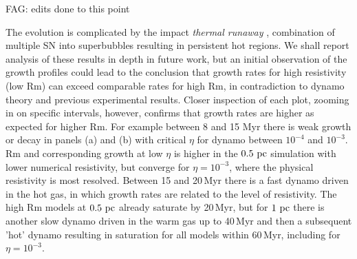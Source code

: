 \documentclass[preprint2]{aastex63}
\newcommand\pc{~ {\rm pc}}
\newcommand{\fag}[1]{\textcolor{midgreen}{FAG: #1}}
\begin{document}
\fag{edits done to this point}

The evolution is complicated by the impact \emph{thermal runaway}
\citep[see e.g.,][]{LOCBN15}, combination of multiple SN into superbubbles
resulting in persistent hot regions.
We shall report analysis of these results in depth in future work, but an 
initial observation of the growth profiles could lead to the conclusion that
growth rates for high resistivity (low Rm) can exceed comparable rates for high
Rm, in contradiction to dynamo theory and previous experimental results.
Closer inspection of each plot, zooming in on specific intervals, however,
confirms that growth rates are higher as expected for higher Rm.
For example between 8 and 15 Myr there is weak growth or decay in panels (a)
and (b) with critical $\eta$ for dynamo between $10^{-4}$ and $10^{-3}$.
Rm and corresponding growth at low $\eta$ is higher in the $0.5\pc$ simulation
with lower numerical resistivity, but 
converge for $\eta=10^{-3}$, where the physical resistivity is most resolved.
Between 15 and 20\,Myr there is a fast dynamo driven in the hot gas, in which
growth rates are related to the level of resistivity.
The high Rm models at $0.5\pc$ already saturate by 20\,Myr, but for $1\pc$ there
is another slow dynamo driven in the warm gas up to 40\,Myr and then a
subsequent 'hot' dynamo resulting in saturation for all models within 60\,Myr,
including for $\eta=10^{-3}$.
\end{document}
